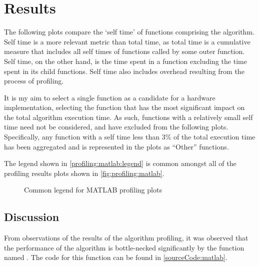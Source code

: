 \section{Results}
\label{profiling:matlab:results}
The following plots compare the `self time' of functions comprising the
 algorithm. Self time is a more
relevant metric than total time, as total time is a cumulative measure that
includes all self times of functions called by some outer function. Self time,
on the other hand, is the time spent in a function excluding the time spent in
its child functions. Self time also includes overhead resulting from the process
of profiling.

It is my aim to select a single function as a candidate for a hardware
implementation, selecting the function that has the most significant impact on
the total algorithm execution time. As such, functions with a relatively small
self time need not be considered, and have excluded from the following plots.
Specifically, any function with a self time less than 3\% of the total execution
time has been aggregated and is represented in the plots as ``Other'' functions.

The legend shown in \autoref{profiling:matlab:legend} is common amongst all of
the  profiling results plots shown in
\autoref{fig:profiling:matlab}.

\begin{figure}
    \centering
    
    \caption{Common legend for MATLAB profiling plots}
    \label{profiling:matlab:legend}
\end{figure}


\subsection{Discussion}
\label{profiling:matlab:discussion}
From observations of the results of the algorithm profiling, it was observed
that the performance of the 
algorithm is bottle-necked significantly by the function named
. The  code for this
function can be found in \autoref{sourceCode:matlab}.

